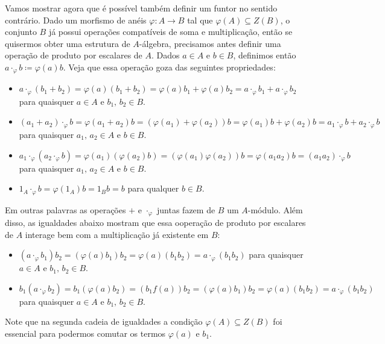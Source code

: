 Vamos mostrar agora que é possível também definir um funtor no sentido contrário.
Dado um morfismo de anéis $\varphi: A \to B$ tal que $\varphi(A) \subseteq Z(B)$, o conjunto $B$ já possui operações compatíveis de soma e multiplicação, então se quisermos obter uma estrutura de $A$-álgebra, precisamos antes definir uma operação de produto por escalares de $A$.
Dados $a \in A$ e $b \in B$, definimos então $a \cdot_{\varphi} b \coloneqq \varphi(a)b$.
Veja que essa operação goza das seguintes propriedades:
\begin{itemize}
\item $a \cdot_{\varphi} (b_{1}+b_{2}) = \varphi(a)(b_{1}+b_{2}) = \varphi(a)b_{1} + \varphi(a)b_{2} = a \cdot_{\varphi} b_{1} + a \cdot_{\varphi} b_{2}$ para quaisquer $a \in A$ e $b_{1},\, b_{2} \in B$.
  
\item $(a_{1}+a_{2}) \cdot_{\varphi} b = \varphi(a_{1}+a_{2})b = (\varphi(a_{1})+\varphi(a_{2}))b = \varphi(a_{1})b + \varphi(a_{2})b = a_{1} \cdot_{\varphi} b + a_{2} \cdot_{\varphi} b$ para quaisquer $a_{1},\, a_{2} \in A$ e $b \in B$.
  
\item $a_{1} \cdot_{\varphi} (a_{2} \cdot_{\varphi} b) = \varphi(a_{1})(\varphi(a_{2})b) = (\varphi(a_{1})\varphi(a_{2}))b = \varphi(a_{1}a_{2})b = (a_{1}a_{2}) \cdot_{\varphi} b$ para quaisquer $a_{1},\,a_{2} \in A$ e $b \in B$.
  
\item $1_{A} \cdot_{\varphi} b = \varphi(1_{A})b = 1_{B}b = b$ para qualquer $b \in B$.
\end{itemize}

Em outras palavras as operações $+$ e $\cdot_{\varphi}$ juntas fazem de $B$ um $A$-módulo.
Além disso, as igualdades abaixo mostram que essa ooperação de produto por escalares de $A$ interage bem com a multiplicação já existente em $B$:
\begin{itemize}
\item $(a \cdot_{\varphi} b_{1})b_{2} = (\varphi(a)b_{1})b_{2} = \varphi(a)(b_{1}b_{2}) = a \cdot_{\varphi} (b_{1}b_{2})$ para quaisquer $a \in A$ e $b_{1},\, b_{2} \in B$.
  
\item $b_{1}(a \cdot_{\varphi} b_{2}) = b_{1}(\varphi(a)b_{2}) = (b_{1}f(a))b_{2} = (\varphi(a)b_{1})b_{2} = \varphi(a)(b_{1}b_{2}) = a \cdot_{\varphi}(b_{1}b_{2})$ para quaisquer $a \in A$ e $b_{1},\, b_{2} \in B$.
\end{itemize}
Note que na segunda cadeia de igualdades a condição $\varphi(A) \subseteq Z(B)$ foi essencial para podermos comutar os termos $\varphi(a)$ e $b_{1}$.

